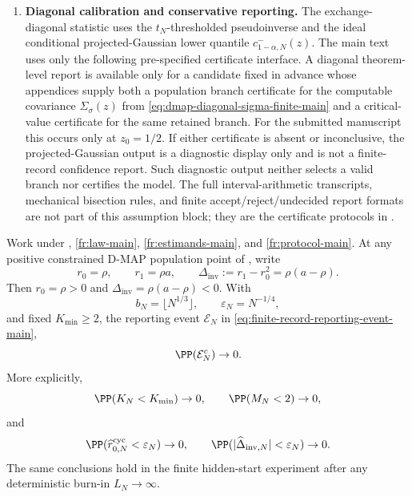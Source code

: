 \begin{assumption}
\begin{enumerate}[label=\textup{FR-\arabic*.},ref=FR-\arabic*,leftmargin=3.0em,itemsep=0.45em]
\item\label{fr:mc-main}\textbf{Diagonal calibration and conservative reporting.}
The exchange-diagonal statistic uses the \(t_N\)-thresholded pseudoinverse and
the ideal conditional projected-Gaussian lower quantile
\(c^{-}_{1-\alpha,N}(z)\).  The main text uses only the following
pre-specified certificate interface.  A diagonal theorem-level report is
available only for a candidate fixed in advance whose appendices supply both a
population branch certificate for the computable covariance
\(\Sigma_\sigma(z)\) from \eqref{eq:dmap-diagonal-sigma-finite-main} and a
critical-value certificate for the same retained branch.  For the submitted
manuscript this occurs only at \(z_0=1/2\).  If either certificate is absent or
inconclusive, the projected-Gaussian output is a diagnostic display only and
is not a finite-record confidence report.  Such diagnostic output neither
selects a valid branch nor certifies the model.  The full interval-arithmetic
transcripts, mechanical bisection rules, and finite accept/reject/undecided
report formats are not part of this assumption block; they are the certificate
protocols in
.
\end{enumerate}
\end{assumption}

\begin{lemma}\label{lem:finite-record-reporting-gate-main}
Work under ,
\ref{fr:law-main}, \ref{fr:estimands-main}, and \ref{fr:protocol-main}.
At any positive constrained D-MAP population point of
, write
\[
r_0=\rho,\qquad r_1=\rho a,\qquad \Delta_{\mathrm{inv}}:=r_1-r_0^2=\rho(a-\rho).
\]
Then \(r_0=\rho>0\) and \(\Delta_{\mathrm{inv}}=\rho(a-\rho)<0\).
With
\[
b_N=\lfloor N^{1/3}\rfloor,\qquad
\varepsilon_N=N^{-1/4},
\]
and fixed \(K_{\min}\ge2\), the reporting event \(\mathcal E_N\) in
\eqref{eq:finite-record-reporting-event-main},
\[
\PP(\mathcal E_N^c)\to0 .
\]
More explicitly,
\[
\PP(K_N<K_{\min})\to0,\qquad
\PP(M_N<2)\to0,
\]
and
\[
\PP(\widehat r_{0,N}^{\mathrm{cyc}}<\varepsilon_N)\to0,\qquad
\PP(|\widehat\Delta_{\mathrm{inv},N}|<\varepsilon_N)\to0 .
\]
The same conclusions hold in the finite hidden-start experiment after any
deterministic burn-in \(L_N\to\infty\).
\end{lemma}


